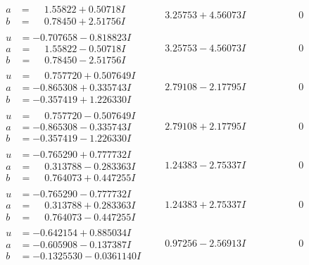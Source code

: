 \documentclass[1p]{elsarticle_modified}
\theoremstyle{definition}
\begin{document}
$$\begin{array}{c|c|c}
\begin{aligned}
a &= \phantom{-}1.55822 + 0.50718 I \\
b &= \phantom{-}0.78450 + 2.51756 I\end{aligned}
 & \phantom{-}3.25753 + 4.56073 I & \phantom{-0.000000 } 0 \\ \hline\begin{aligned}
u &= -0.707658 - 0.818823 I \\
a &= \phantom{-}1.55822 - 0.50718 I \\
b &= \phantom{-}0.78450 - 2.51756 I\end{aligned}
 & \phantom{-}3.25753 - 4.56073 I & \phantom{-0.000000 } 0 \\ \hline\begin{aligned}
u &= \phantom{-}0.757720 + 0.507649 I \\
a &= -0.865308 + 0.335743 I \\
b &= -0.357419 + 1.226330 I\end{aligned}
 & \phantom{-}2.79108 - 2.17795 I & \phantom{-0.000000 } 0 \\ \hline\begin{aligned}
u &= \phantom{-}0.757720 - 0.507649 I \\
a &= -0.865308 - 0.335743 I \\
b &= -0.357419 - 1.226330 I\end{aligned}
 & \phantom{-}2.79108 + 2.17795 I & \phantom{-0.000000 } 0 \\ \hline\begin{aligned}
u &= -0.765290 + 0.777732 I \\
a &= \phantom{-}0.313788 - 0.283363 I \\
b &= \phantom{-}0.764073 + 0.447255 I\end{aligned}
 & \phantom{-}1.24383 - 2.75337 I & \phantom{-0.000000 } 0 \\ \hline\begin{aligned}
u &= -0.765290 - 0.777732 I \\
a &= \phantom{-}0.313788 + 0.283363 I \\
b &= \phantom{-}0.764073 - 0.447255 I\end{aligned}
 & \phantom{-}1.24383 + 2.75337 I & \phantom{-0.000000 } 0 \\ \hline\begin{aligned}
u &= -0.642154 + 0.885034 I \\
a &= -0.605908 - 0.137387 I \\
b &= -0.1325530 - 0.0361140 I\end{aligned}
 & \phantom{-}0.97256 - 2.56913 I & \phantom{-0.000000 } 0 \\ \hline\begin{aligned}

\end{aligned}
\end{array}$$
\end{document}
